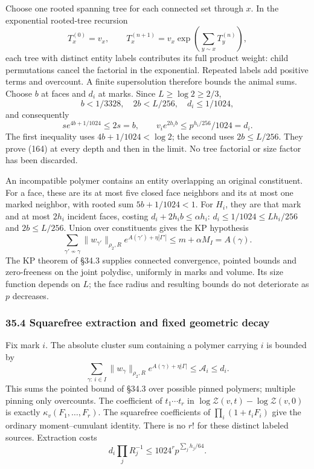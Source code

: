 \documentclass[11pt,a4paper]{article}
\begin{document}
Choose one rooted spanning tree for each connected set through \(x\). In
the exponential rooted-tree recursion \[T_x^{(0)}=v_x,\qquad
T_x^{(n+1)}=v_x\exp\left(\sum_{y\sim x}T_y^{(n)}\right),\] each tree
with distinct entity labels contributes its full product weight: child
permutations cancel the factorial in the exponential. Repeated labels
add positive terms and overcount. A finite supersolution therefore
bounds the animal sums. Choose \(b\) at faces and \(d_i\) at marks.
Since \(L\ge\log2\ge2/3\),
\[b<1/3328,\quad 2b<L/256,\quad d_i\le1/1024,\] and consequently
\[s e^{4b+1/1024}\le2s=b,\qquad
v_i e^{2h_i b}\le p^{h_i/256}/1024=d_i.\] The first inequality uses
\(4b+1/1024<\log2\); the second uses \(2b\le L/256\). They prove (164)
at every depth and then in the limit. No tree factorial or size factor
has been discarded.

An incompatible polymer contains an entity overlapping an original
constituent. For a face, these are its at most five closed face
neighbors and its at most one marked neighbor, with rooted sum
\(5b+1/1024<1\). For \(H_i\), they are that mark and at most \(2h_i\)
incident faces, costing \(d_i+2h_i b\le\alpha h_i\):
\(d_i\le1/1024\le Lh_i/256\) and \(2b\le L/256\). Union over
constituents gives the KP hypothesis \[\sum_{\gamma'\not\sim\gamma}
 \|w_{\gamma'}\|_{\rho_2,R}
 e^{A(\gamma')+\eta|\Gamma'|}
 \le m+\alpha M_I=A(\gamma).\tag{165}\] The KP theorem of §34.3 supplies
connected convergence, pointed bounds and zero-freeness on the joint
polydisc, uniformly in marks and volume. Its size function depends on
\(L\); the face radius and resulting bounds do not deteriorate as \(p\)
decreases.

\hypertarget{squarefree-extraction-and-fixed-geometric-decay}{%
\subsubsection{35.4 Squarefree extraction and fixed geometric
decay}\label{squarefree-extraction-and-fixed-geometric-decay}}

Fix mark \(i\). The absolute cluster sum containing a polymer carrying
\(i\) is bounded by \[\sum_{\gamma:\ i\in I}\|w_\gamma\|_{\rho_2,R}
 e^{A(\gamma)+\eta|\Gamma|}\le\mathcal A_i\le d_i.\] This sums the
pointed bound of §34.3 over possible pinned polymers; multiple pinning
only overcounts. The coefficient of \(t_1\cdots t_r\) in
\(\log\mathcal Z(v,t)-\log\mathcal Z(v,0)\) is exactly
\(\kappa_v(F_1,\ldots,F_r)\). The squarefree coefficients of
\(\prod_i(1+t_iF_i)\) give the ordinary moment--cumulant identity. There
is no \(r!\) for these distinct labeled sources. Extraction costs
\[d_i\prod_jR_j^{-1}\le1024^r p^{\sum_jh_j/64}.\]
\end{document}
